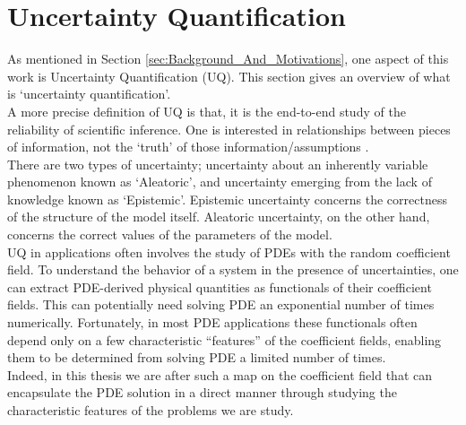 \section{Uncertainty Quantification}
As mentioned in Section \eqref{sec:Background_And_Motivations}, one aspect of this work is Uncertainty Quantification (UQ). This section gives an overview of what is `uncertainty quantification'.\\
A more precise definition of UQ is that, it is the end-to-end study of the reliability of scientific inference. One is interested in relationships between pieces of information, not the `truth' of those information/assumptions \cite{UQIntro_Sullivan}.\\
There are two types of uncertainty; uncertainty about an inherently variable phenomenon known as `Aleatoric', and uncertainty emerging from the lack of knowledge known as `Epistemic'. Epistemic uncertainty concerns the correctness of the structure of the model itself. Aleatoric uncertainty, on the other hand, concerns the correct values of the parameters of the model.\\
UQ in applications often involves the study of PDEs with the random coefficient field. To understand the behavior of a system in the presence of uncertainties, one can extract PDE-derived physical quantities as functionals of their coefficient fields. This can potentially need solving PDE an exponential number of times numerically. Fortunately, in most PDE applications these functionals often depend only on a few characteristic ``features'' of the coefficient fields, enabling them to be determined from solving PDE a limited number of times.\\
Indeed, in this thesis we are after such a map on the coefficient field that can encapsulate the PDE solution in a direct manner through studying the characteristic features of the problems we are study.
